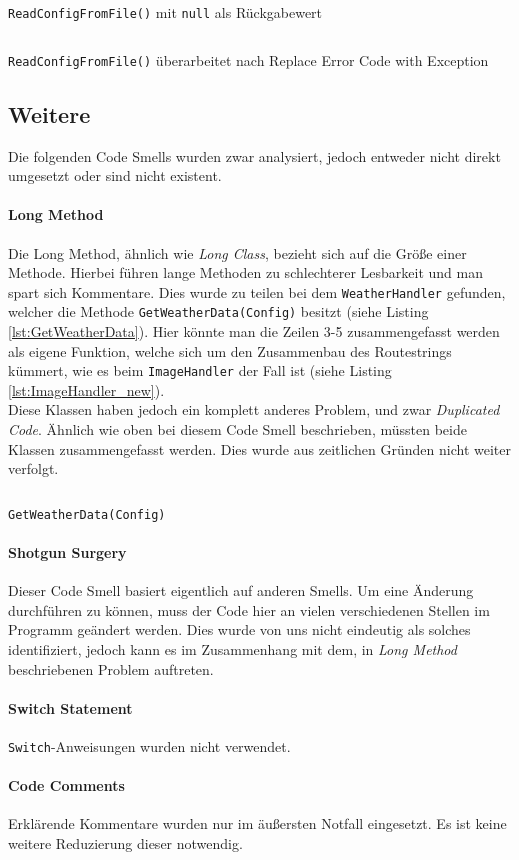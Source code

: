 \begin{listing}[h]
	\inputminted[linenos=true,frame=lines]{csharp}{Listings/ReadConfigFromFile_old.cs}
	\caption{\texttt{ReadConfigFromFile()} mit \texttt{null} als Rückgabewert}
	\label{lst:ReadConfigFromFile_old}
\end{listing}

\begin{listing}[h]
	\inputminted[linenos=true,frame=lines]{csharp}{Listings/ReadConfigFromFile_new.cs}
	\caption{\texttt{ReadConfigFromFile()} überarbeitet nach Replace Error Code with Exception}
	\label{lst:ReadConfigFromFile_new}
\end{listing}

\subsection{Weitere}
Die folgenden Code Smells wurden zwar analysiert, jedoch entweder nicht direkt umgesetzt oder sind nicht existent.
\paragraph{Long Method}
Die Long Method, ähnlich wie \textit{Long Class}, bezieht sich auf die Größe einer Methode.
Hierbei führen lange Methoden zu schlechterer Lesbarkeit und man spart sich Kommentare.
Dies wurde zu teilen bei dem \texttt{WeatherHandler} gefunden, welcher die Methode \texttt{GetWeatherData(Config)} besitzt (siehe Listing \ref{lst:GetWeatherData}).
Hier könnte man die Zeilen 3-5 zusammengefasst werden als eigene Funktion, welche sich um den Zusammenbau des Routestrings kümmert, wie es beim \texttt{ImageHandler} der Fall ist (siehe Listing \ref{lst:ImageHandler_new}).\\
Diese Klassen haben jedoch ein komplett anderes Problem, und zwar \textit{Duplicated Code}. 
Ähnlich wie oben bei diesem Code Smell beschrieben, müssten beide Klassen zusammengefasst werden.
Dies wurde aus zeitlichen Gründen nicht weiter verfolgt.

\begin{listing}[h]
	\inputminted[linenos=true,frame=lines]{csharp}{Listings/GetWeatherData.cs}
	\caption{\texttt{GetWeatherData(Config)}}
	\label{lst:GetWeatherData}
\end{listing}
\paragraph{Shotgun Surgery}
Dieser Code Smell basiert eigentlich auf anderen Smells. 
Um eine Änderung durchführen zu können, muss der Code hier an vielen verschiedenen Stellen im Programm geändert werden.
Dies wurde von uns nicht eindeutig als solches identifiziert, jedoch kann es im Zusammenhang mit dem, in \textit{Long Method} beschriebenen Problem auftreten.
\paragraph{Switch Statement}
\texttt{Switch}-Anweisungen wurden nicht verwendet.
\paragraph{Code Comments}
Erklärende Kommentare wurden nur im äußersten Notfall eingesetzt.
Es ist keine weitere Reduzierung dieser notwendig.